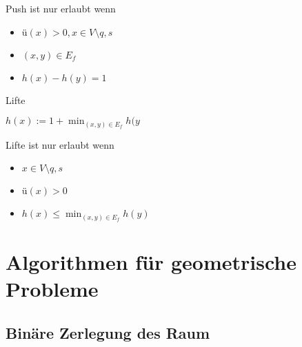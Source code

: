 Push ist nur erlaubt wenn 
	\begin{itemize}
		\item $ü(x) > 0, x \in V \setminus {q,s}$
		\item $(x,y) \in E_f$
		\item $h(x) - h(y) = 1$
	\end{itemize} 


\begin{algorithm}[H]
	\caption{Lifte}

	\Output{}
	\BlankLine

	$h(x) := 1+ \min_{(x,y) \in E_f}{h(y}$
\end{algorithm}

Lifte ist nur erlaubt wenn 
	\begin{itemize}
		\item $x \in V \setminus {q,s}$
		\item $ü(x) > 0$
		\item $h(x) \leqslant \min_{(x,y) \in E_f}{h(y)}$
	\end{itemize} 




\section{Algorithmen für geometrische Probleme}

\subsection{Binäre Zerlegung des Raum}
